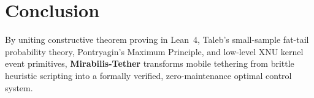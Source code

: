 \documentclass[11pt,a4paper]{article}
\theoremstyle{definition}
\begin{document}
\section{Conclusion}

By uniting constructive theorem proving in Lean~4, Taleb's small-sample fat-tail probability theory, Pontryagin's Maximum Principle, and low-level XNU kernel event primitives, \textbf{Mirabilis-Tether} transforms mobile tethering from brittle heuristic scripting into a formally verified, zero-maintenance optimal control system.
\end{document}
